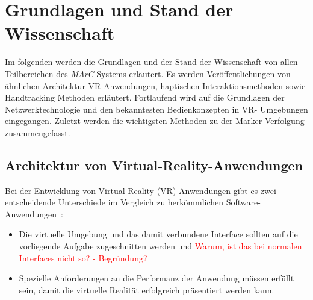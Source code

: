 \section{Grundlagen und Stand der Wissenschaft} \label{sec:grundlagen}
Im folgenden werden die Grundlagen und der Stand der Wissenschaft von allen Teilbereichen des \textit{MArC} Systems erläutert. Es werden Veröffentlichungen von ähnlichen Architektur VR-Anwendungen, haptischen Interaktionsmethoden sowie Handtracking Methoden erläutert. Fortlaufend wird auf die Grundlagen der Netzwerktechnologie und den bekanntesten Bedienkonzepten in VR- Umgebungen eingegangen. Zuletzt werden die wichtigsten Methoden zu der Marker-Verfolgung zusammengefasst.

\subsection{Architektur von Virtual-Reality-Anwendungen}\label{sec:ArchitekturAnwendungen}
Bei der Entwicklung von Virtual Reality (VR) Anwendungen gibt es zwei entscheidende Unterschiede im Vergleich zu herkömmlichen Software-Anwendungen~\cite{bryson1995approaches}:
\begin{itemize}
	\item Die virtuelle Umgebung und das damit verbundene Interface sollten auf die vorliegende Aufgabe zugeschnitten werden und \textcolor{red}{Warum, ist das bei normalen Interfaces nicht so? - Begründung?}
	\item Spezielle Anforderungen an die Performanz der Anwendung müssen erfüllt sein, damit die virtuelle Realität erfolgreich präsentiert werden kann. 
\end{itemize}

